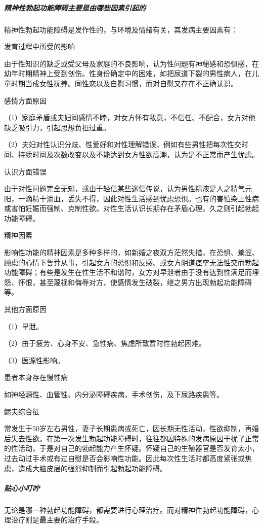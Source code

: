 \subparagraph{精神性勃起功能障碍主要是由哪些因素引起的}

精神性勃起功能障碍是发作性的，与环境及情绪有关，其发病主要因素有：

发育过程中所受的影响

由于性知识的缺乏或受父母及家庭的不良影响，认为性问题有神秘感和恐惧感，在幼年时期精神上受到创伤。性身份确定中的困难，如把尿道下裂的男性病人，在儿童时期当成女性抚养。同性恋以及自慰习惯，而对自慰又存在不正确认识。

感情方面原因

（1）家庭矛盾或夫妇间感情不睦，对女方怀有敌意，不信任、不配合，女方对他缺乏吸引力，引起思想负担过重。

（2）夫妇对性认识分歧、性爱好和对性理解错误，例如有些男性把每次性交时间、持续时间及次数改变以及不能达到女方性欲高潮，认为是不正常而产生忧虑。

认识方面错误

由于对性问题完全无知，或由于轻信某些迷信传说，认为男性精液是人之精气元阳，一滴精十滴血，丢失不得，因此对性生活感到忧虑恐惧。也有的害怕染上性病或害怕妊娠而强制、克制性欲。对性生活认识长期存在矛盾心理，久之则引起勃起功能障碍。

精神因素

影响性功能的精神因素是多种多样的，如新婚之夜双方茫然失措，在恐惧、羞涩、顾虑的心情下鲁莽从事，引起女方的恐惧和反感、或女方阴道痉挛无法性交而勃起功能障碍；有些是发生在性生活不和谐时，女方对早泄者由于没有达到性满足而埋怨、怀恨，甚至蔑视和侮辱对方，使感情发生破裂，继之男方出现勃起功能障碍等。

其他方面原因

（1）早泄。

（2）由于疲劳、心身不安、急性病、焦虑所致暂时性勃起困难。

（3）医源性影响。

患者本身存在慢性病

如神经源性、血管性、内分泌障碍疾病，手术创伤，及下尿路疾患等。

鳏夫综合征

常发生于50岁左右男性，妻子长期患病或死亡，因长期无性活动，性欲抑制，再婚后失去性欲。在第一次发生勃起功能障碍时，往往都因特殊的发病原因干扰了正常的性活动，于是对自己的勃起能力产生怀疑。怀疑自己的生殖器官是否发育太小，过去动过手术或有过自慰是否会影响性功能。因此每次性生活时都高度紧张或焦虑，造成大脑皮层的强烈抑制而引起勃起功能障碍。

\subparagraph{贴心小叮咛}

无论是哪一种勃起功能障碍，都需要进行心理治疗。而对精神性勃起功能障碍，心理治疗则是最主要的治疗手段。

